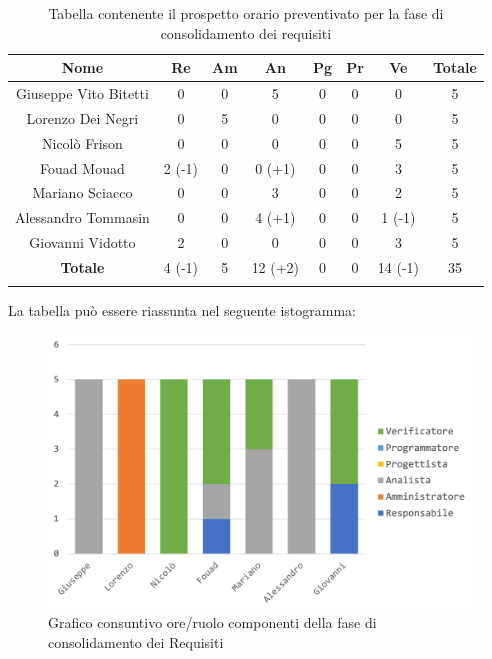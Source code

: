 			\begin{longtable}{|c|c|c|c|c|c|c|c}
				\hline
				\rowcolor{lighter-grayer}
				\textbf{Nome} & \textbf{Re} & \textbf{Am} & \textbf{An} & \textbf{Pg}  & \textbf{Pr}   & \textbf{Ve} & \textbf{Totale} \\
				\hline
				\endfirsthead
				
				\hline
				Giuseppe Vito Bitetti & 0 & 0 & 5 & 0 & 0 & 0 & 5\\
				\hline
				\hline
				Lorenzo Dei Negri & 0 & 5 & 0 & 0 & 0 & 0 & 5\\
				\hline
				\hline
				Nicolò Frison & 0 & 0 & 0 & 0 & 0 & 5 & 5\\
				\hline
				\hline
				Fouad Mouad & 2 (-1) & 0 & 0 (+1) & 0 & 0 & 3 & 5\\
				\hline
				\hline
				Mariano Sciacco & 0 & 0 & 3 & 0 & 0 & 2 & 5\\
				\hline
				\hline
				Alessandro Tommasin & 0 & 0 & 4 (+1) & 0 & 0 & 1 (-1) & 5\\
				\hline
				\hline
				Giovanni Vidotto & 2 & 0 & 0 & 0 & 0 & 3 & 5\\
				\hline 
				\textbf{Totale} & 4 (-1) &  5 & 12 (+2) & 0 & 0 & 14 (-1) & 35\\
				\hline
				\caption{Tabella contenente il prospetto orario preventivato per la fase di consolidamento dei requisiti}
			\end{longtable}
			\pagebreak	
			
			La tabella può essere riassunta nel seguente istogramma:
			
			\begin{figure}[H]
				\centering
				\includegraphics[width=0.8\linewidth]{images/consuntivo/ConsReqCons.png}
				\caption{Grafico consuntivo ore/ruolo componenti della fase di consolidamento dei Requisiti}
				\label{fig:consuntivo grafico suddivione ruoli fase di consolidamento dei requisiti}
			\end{figure}
			
